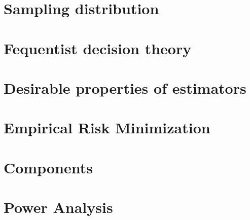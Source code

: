 \section{Sampling distribution}


\section{Fequentist decision theory}


\section{Desirable properties of estimators}


\section{Empirical Risk Minimization}


\section{Components}


\section{Power Analysis}


